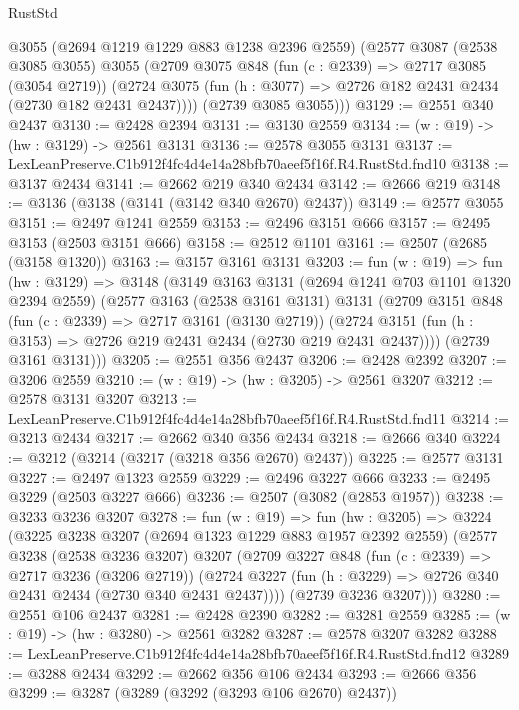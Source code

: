 \begin{lexlean}{RustStd}
\begin{coremodule}
      @3055
      (@2694 @1219 @1229 @883 @1238 @2396 @2559)
      (@2577
        @3087
        (@2538 @3085 @3055)
        @3055
        (@2709
          @3075
          @848
          (fun (c : @2339) => @2717 @3085 (@3054 @2719))
          (@2724 @3075 (fun (h : @3077) => @2726 @182 @2431 @2434 (@2730 @182 @2431 @2437))))
        (@2739 @3085 @3055)))
@3129 := @2551 @340 @2437
@3130 := @2428 @2394
@3131 := @3130 @2559
@3134 := (w : @19) -> (hw : @3129) -> @2561 @3131
@3136 := @2578 @3055 @3131
@3137 := LexLeanPreserve.C1b912f4fc4d4e14a28bfb70aeef5f16f.R4.RustStd.fnd10
@3138 := @3137 @2434
@3141 := @2662 @219 @340 @2434
@3142 := @2666 @219
@3148 := @3136 (@3138 (@3141 (@3142 @340 @2670) @2437))
@3149 := @2577 @3055
@3151 := @2497 @1241 @2559
@3153 := @2496 @3151 @666
@3157 := @2495 @3153 (@2503 @3151 @666)
@3158 := @2512 @1101
@3161 := @2507 (@2685 (@3158 @1320))
@3163 := @3157 @3161 @3131
@3203 := fun (w : @19) =>
  fun (hw : @3129) =>
  @3148
    (@3149
      @3163
      @3131
      (@2694 @1241 @703 @1101 @1320 @2394 @2559)
      (@2577
        @3163
        (@2538 @3161 @3131)
        @3131
        (@2709
          @3151
          @848
          (fun (c : @2339) => @2717 @3161 (@3130 @2719))
          (@2724 @3151 (fun (h : @3153) => @2726 @219 @2431 @2434 (@2730 @219 @2431 @2437))))
        (@2739 @3161 @3131)))
@3205 := @2551 @356 @2437
@3206 := @2428 @2392
@3207 := @3206 @2559
@3210 := (w : @19) -> (hw : @3205) -> @2561 @3207
@3212 := @2578 @3131 @3207
@3213 := LexLeanPreserve.C1b912f4fc4d4e14a28bfb70aeef5f16f.R4.RustStd.fnd11
@3214 := @3213 @2434
@3217 := @2662 @340 @356 @2434
@3218 := @2666 @340
@3224 := @3212 (@3214 (@3217 (@3218 @356 @2670) @2437))
@3225 := @2577 @3131
@3227 := @2497 @1323 @2559
@3229 := @2496 @3227 @666
@3233 := @2495 @3229 (@2503 @3227 @666)
@3236 := @2507 (@3082 (@2853 @1957))
@3238 := @3233 @3236 @3207
@3278 := fun (w : @19) =>
  fun (hw : @3205) =>
  @3224
    (@3225
      @3238
      @3207
      (@2694 @1323 @1229 @883 @1957 @2392 @2559)
      (@2577
        @3238
        (@2538 @3236 @3207)
        @3207
        (@2709
          @3227
          @848
          (fun (c : @2339) => @2717 @3236 (@3206 @2719))
          (@2724 @3227 (fun (h : @3229) => @2726 @340 @2431 @2434 (@2730 @340 @2431 @2437))))
        (@2739 @3236 @3207)))
@3280 := @2551 @106 @2437
@3281 := @2428 @2390
@3282 := @3281 @2559
@3285 := (w : @19) -> (hw : @3280) -> @2561 @3282
@3287 := @2578 @3207 @3282
@3288 := LexLeanPreserve.C1b912f4fc4d4e14a28bfb70aeef5f16f.R4.RustStd.fnd12
@3289 := @3288 @2434
@3292 := @2662 @356 @106 @2434
@3293 := @2666 @356
@3299 := @3287 (@3289 (@3292 (@3293 @106 @2670) @2437))

\end{coremodule}
\end{lexlean}
